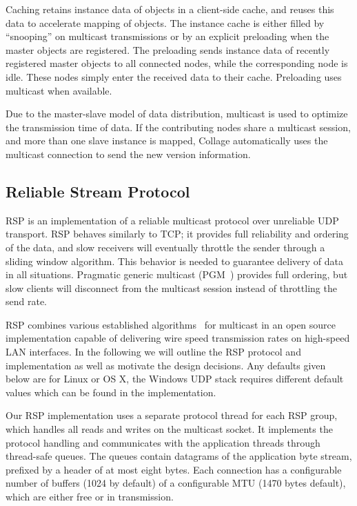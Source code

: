 Caching retains instance data of objects in a client-side cache, and reuses this
data to accelerate mapping of objects. The instance cache is either filled by
``snooping'' on multicast transmissions or by an explicit preloading when the
master objects are registered. The preloading sends instance data of recently
registered master objects to all connected nodes, while the corresponding node
is idle. These nodes simply enter the received data to their cache. Preloading
uses multicast when available.

Due to the master-slave model of data distribution, multicast is used to
optimize the transmission time of data. If the contributing nodes share a
multicast session, and more than one slave instance is mapped, \textsf{Collage}
automatically uses the multicast connection to send the new version information.

\subsection{Reliable Stream Protocol}\label{sec:RSP}

RSP is an implementation of a reliable multicast protocol over unreliable UDP
transport. RSP behaves similarly to TCP; it provides full reliability and
ordering of the data, and slow receivers will eventually throttle the sender
through a sliding window algorithm. This behavior is needed to guarantee
delivery of data in all situations. Pragmatic generic multicast (PGM~\cite{pgm})
provides full ordering, but slow clients will disconnect from the multicast
session instead of throttling the send rate.

RSP combines various established algorithms~\cite{adamson2004negative,
  Gau:2002:MFC:506824.506832} for multicast in an open source implementation
capable of delivering wire speed transmission rates on high-speed LAN
interfaces. In the following we will outline the RSP protocol and implementation
as well as motivate the design decisions. Any defaults given below are for
Linux or OS X, the Windows UDP stack requires different default values which can
be found in the implementation.

Our RSP implementation uses a separate protocol thread for each RSP group, which
handles all reads and writes on the multicast socket. It implements the protocol
handling and communicates with the application threads through thread-safe
queues. The queues contain datagrams of the application byte stream, prefixed by
a header of at most eight bytes. Each connection has a configurable number of
buffers (1024 by default) of a configurable MTU (1470 bytes default), which are
either free or in transmission.

